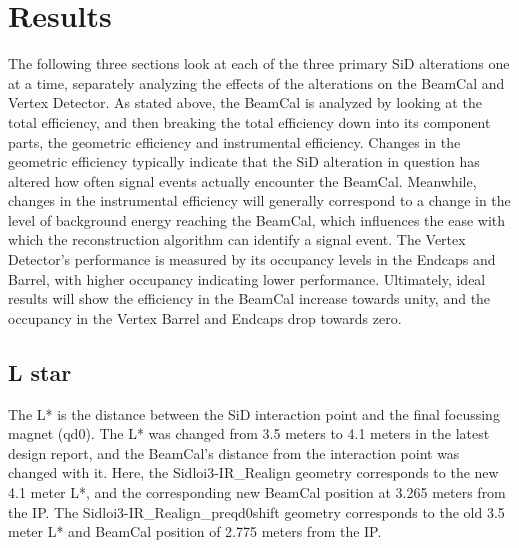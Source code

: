 \documentclass{report}
\begin{document}
        \section{Results}
            The following three sections look at each of the three primary SiD alterations one at a time, separately analyzing the effects of the alterations on the BeamCal and Vertex Detector. As stated above, the BeamCal is analyzed by looking at the total efficiency, and then breaking the total efficiency down into its component parts, the geometric efficiency and instrumental efficiency. Changes in the geometric efficiency typically indicate that the SiD alteration in question has altered how often signal events actually encounter the BeamCal. Meanwhile, changes in the instrumental efficiency will generally correspond to a change in the level of background energy reaching the BeamCal, which influences the ease with which the reconstruction algorithm can identify a signal event. The Vertex Detector's performance is measured by its occupancy levels in the Endcaps and Barrel, with higher occupancy indicating lower performance. Ultimately, ideal results will show the efficiency in the BeamCal increase towards unity, and the occupancy in the Vertex Barrel and Endcaps drop towards zero.

            \subsection{L star} \label{sect__analysis_lstar}
                The L* is the distance between the SiD interaction point and the final focussing magnet (qd0). The L* was changed from 3.5 meters to 4.1 meters in the latest design report, and the BeamCal's distance from the interaction point was changed with it. Here, the Sidloi3-IR\_Realign geometry corresponds to the new 4.1 meter L*, and the corresponding new BeamCal position at 3.265 meters from the IP. The Sidloi3-IR\_Realign\_preqd0shift geometry corresponds to the old 3.5 meter L* and BeamCal position of 2.775 meters from the IP.
\end{document}
